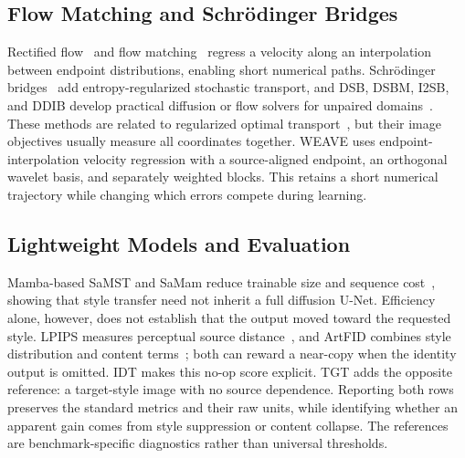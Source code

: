 \documentclass[letterpaper]{article}
\begin{document}
\subsection{Flow Matching and Schr\"odinger Bridges}
\label{sec:rw-sb}
Rectified flow~\cite{liu2022rectified} and flow matching~\cite{lipman2022flow} regress a
velocity along an interpolation between endpoint distributions, enabling short numerical
paths. Schr\"odinger bridges~\cite{leonard2014survey} add entropy-regularized stochastic
transport, and DSB, DSBM, I2SB, and DDIB develop practical diffusion or flow solvers for
unpaired domains~\cite{debortoli2021dsb,shi2023dsbm,liu2023i2sb,su2023ddib}. These methods
are related to regularized optimal transport~\cite{cuturi2013sinkhorn,peyre2019computational},
but their image objectives usually measure all coordinates together.
WEAVE uses endpoint-interpolation velocity regression with a source-aligned endpoint,
an orthogonal wavelet basis, and separately weighted blocks. This retains a short numerical
trajectory while changing which errors compete during learning.

\subsection{Lightweight Models and Evaluation}
\label{sec:rw-light}
Mamba-based SaMST and SaMam reduce trainable size and sequence cost~\cite{liu2024samst,liu2024samam,gu2023mamba},
showing that style transfer need not inherit a full diffusion U-Net. Efficiency alone,
however, does not establish that the output moved toward the requested style. LPIPS
measures perceptual source distance~\cite{zhang2018unreasonable}, and ArtFID combines style
distribution and content terms~\cite{wright2022artfid}; both can reward a near-copy when the
identity output is omitted.
IDT makes this no-op score explicit. TGT adds the opposite reference: a target-style image
with no source dependence. Reporting both rows preserves the standard metrics and their raw
units, while identifying whether an apparent gain comes from style suppression or content
collapse. The references are benchmark-specific diagnostics rather than universal thresholds.
\end{document}
